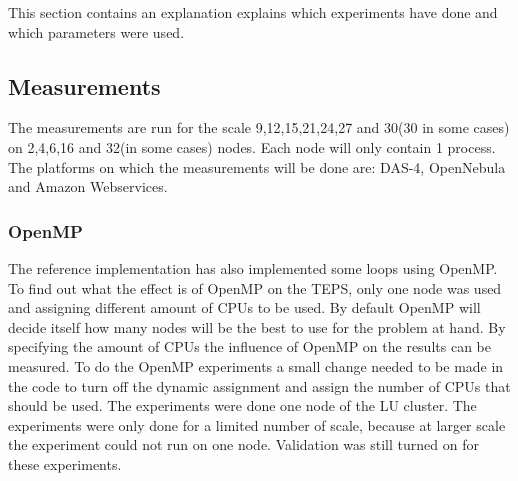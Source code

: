 This section contains an explanation explains which experiments have done and which parameters were used.


\subsection{Measurements}
The measurements are run for the scale 9,12,15,21,24,27 and 30(30 in some cases) on 2,4,6,16 and 32(in some cases) nodes. Each node will only contain 1 process. The platforms on which the measurements will be done are: DAS-4, OpenNebula and Amazon Webservices.

\subsubsection{OpenMP}
The reference  implementation has also implemented some loops using OpenMP. To find out what the effect is of OpenMP on the TEPS, only one node was used and assigning different amount of CPUs to be used. By default OpenMP will decide itself how many nodes will be the best to use for the problem at hand. By specifying the amount of CPUs the influence of OpenMP on the results can be measured. To do the OpenMP experiments a small change needed to be made in the code to turn off the dynamic assignment and assign the number of CPUs that should be used. The experiments were done one node of the LU cluster. The experiments were only done for a limited number of scale, because at larger scale the experiment could not run on one node. Validation was still turned on for these experiments.

